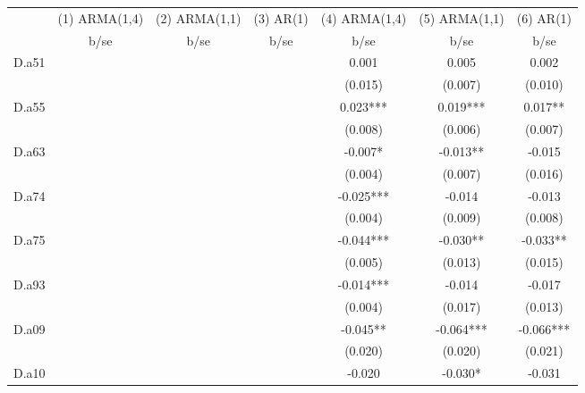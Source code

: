 \begin{tabular}{lcccccc}\toprule
            &(1) ARMA(1,4)   &(2) ARMA(1,1)   &   (3) AR(1)   &(4) ARMA(1,4)   &(5) ARMA(1,1)   &   (6) AR(1)   \\
            &        b/se   &        b/se   &        b/se   &        b/se   &        b/se   &        b/se   \\
\midrule
D.a51       &               &               &               &       0.001   &       0.005   &       0.002   \\
            &               &               &               &     (0.015)   &     (0.007)   &     (0.010)   \\
D.a55       &               &               &               &       0.023***&       0.019***&       0.017** \\
            &               &               &               &     (0.008)   &     (0.006)   &     (0.007)   \\
D.a63       &               &               &               &      -0.007*  &      -0.013** &      -0.015   \\
            &               &               &               &     (0.004)   &     (0.007)   &     (0.016)   \\
D.a74       &               &               &               &      -0.025***&      -0.014   &      -0.013   \\
            &               &               &               &     (0.004)   &     (0.009)   &     (0.008)   \\
D.a75       &               &               &               &      -0.044***&      -0.030** &      -0.033** \\
            &               &               &               &     (0.005)   &     (0.013)   &     (0.015)   \\
D.a93       &               &               &               &      -0.014***&      -0.014   &      -0.017   \\
            &               &               &               &     (0.004)   &     (0.017)   &     (0.013)   \\
D.a09       &               &               &               &      -0.045** &      -0.064***&      -0.066***\\
            &               &               &               &     (0.020)   &     (0.020)   &     (0.021)   \\
D.a10       &               &               &               &      -0.020   &      -0.030*  &      -0.031   \\

\end{tabular}
